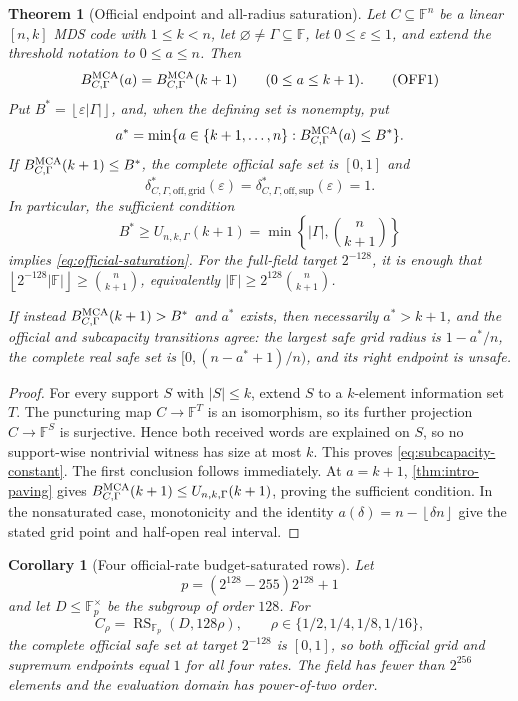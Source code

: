 \documentclass[11pt,a4paper]{amsart}
\numberwithin{equation}{section}
\newtheorem{theorem}{Theorem}[section]
\newtheorem{corollary}[corollary]{Corollary}
\theoremstyle{remark}
\DeclareMathOperator{\RS}{RS}
\newcommand{\F}{\mathbb F}
\newcommand{\eps}{\varepsilon}
\newcommand{\abs}[1]{\lvert #1\rvert}
\newcommand{\floor}[1]{\left\lfloor #1\right\rfloor}
\begin{document}
\begin{theorem}[Official endpoint and all-radius saturation]
\label{thm:official-saturation}
Let \(C\subseteq\F^n\) be a linear \([n,k]\) MDS code with \(1\le k<n\), let
\(\varnothing\ne\Gamma\subseteq\F\), let \(0\le\eps\le1\), and extend the
threshold notation to \(0\le a\le n\).  Then
\[
 B_{C,\Gamma}^{\rm MCA}(a)=B_{C,\Gamma}^{\rm MCA}(k+1)
 \qquad(0\le a\le k+1).                           \tag{OFF1}
 \label{eq:subcapacity-constant}
\]
Put \(B^*=\floor{\eps\abs\Gamma}\), and, when the defining set is
nonempty, put
\[
 a^*=\min\{a\in\{k+1,\ldots,n\}:
               B_{C,\Gamma}^{\rm MCA}(a)\le B^*\}.
\]
If
\(B_{C,\Gamma}^{\rm MCA}(k+1)\le B^*\), the complete official safe set is
\([0,1]\) and
\[
 \delta_{C,\Gamma,\mathrm{off,grid}}^*(\eps)
 =\delta_{C,\Gamma,\mathrm{off,sup}}^*(\eps)=1.   \tag{OFF2}
 \label{eq:official-saturation}
\]
In particular, the sufficient condition
\[
 B^*\ge U_{n,k,\Gamma}(k+1)
     =\min\left\{\abs\Gamma,\binom n{k+1}\right\} \tag{OFF3}
 \label{eq:official-saturation-budget}
\]
implies \eqref{eq:official-saturation}.  For the full-field target
\(2^{-128}\), it is enough that
\(\floor{2^{-128}\abs\F}\ge\binom n{k+1}\), equivalently
\(\abs\F\ge 2^{128}\binom n{k+1}\).

If instead \(B_{C,\Gamma}^{\rm MCA}(k+1)>B^*\) and \(a^*\) exists, then
necessarily \(a^*>k+1\), and the official and subcapacity transitions agree:
the largest safe grid radius is \(1-a^*/n\), the complete real safe set is
\([0,(n-a^*+1)/n)\), and its right endpoint is unsafe.
\end{theorem}

\begin{proof}
For every support \(S\) with \(\abs S\le k\), extend \(S\) to a
\(k\)-element information set \(T\).  The puncturing map
\(C\to\F^T\) is an isomorphism, so its further projection
\(C\to\F^S\) is surjective.  Hence both
received words are explained on \(S\), so no support-wise nontrivial witness
has size at most \(k\).  This proves \eqref{eq:subcapacity-constant}.  The
first conclusion follows immediately.  At \(a=k+1\),
\cref{thm:intro-paving} gives
\(B_{C,\Gamma}^{\rm MCA}(k+1)\le
U_{n,k,\Gamma}(k+1)\), proving the sufficient condition.  In the
nonsaturated case, monotonicity and the identity
\(a(\delta)=n-\floor{\delta n}\) give the stated grid point and half-open
real interval.
\end{proof}

\begin{corollary}[Four official-rate budget-saturated rows]
\label{cor:intro-four-saturated-rows}
Let
\[
 p=(2^{128}-255)2^{128}+1
\]
and let \(D\le\F_p^\times\) be the subgroup of order \(128\).  For
\[
 C_\rho=\RS_{\F_p}(D,128\rho),
 \qquad \rho\in\{1/2,1/4,1/8,1/16\},
\]
the complete official safe set at target \(2^{-128}\) is \([0,1]\), so
both official grid and supremum endpoints equal \(1\) for all four rates.
The field has fewer than \(2^{256}\) elements and the evaluation domain has
power-of-two order.
\end{corollary}
\end{document}
